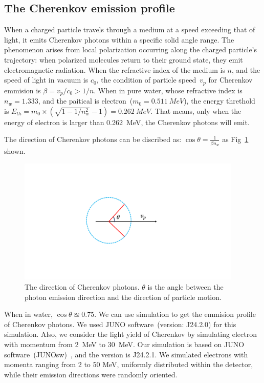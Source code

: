 \subsection{The Cherenkov emission profile}
When a charged particle travels through a medium at a speed exceeding that of light, it emits Cherenkov photons within a specific solid angle range. The phenomenon arises from local polarization occurring along the charged particle's trajectory: when polarized molecules return to their ground state, they emit electromagnetic radiation. When the refractive index of the medium is $n$, and the speed of light in vacuum is $c_0$, the condition of particle speed~$v_p$ for Cherenkov emmision is $\beta=v_p/c_0>1/n$. When in pure water, whose refractive index is $n_w=1.333$, and the paitical is electron~($m_0=\SI{0.511}{MeV}$), the energy threthold is $E_{th}=m_0\times(\sqrt{1-1/n_w^2}-1)=\SI{0.262}{MeV}$. That means, only when the energy of electron is larger than \SI{0.262}{MeV}, the Cherenkov photons will emit.

The direction of Cherenkov photons can be discribed as: $\cos\theta=\frac{1}{\beta n_w}$ as Fig~\ref{Fig:Cherenkov_emmision} shown.

\begin{figure}
	\begin{center}
		\includegraphics[height=6cm]{reconstruction/cherenkov_emission.pdf}
	\end{center}
	\caption{The direction of Cherenkov photons. $\theta$ is the angle between the photon emission direction and the direction of particle motion.}
	\label{Fig:Cherenkov_emmision}
\end{figure}

When in water, $\cos\theta\approxeq0.75$. We can use simulation to get the emmision profile of Cherenkov photons. We used JUNO software~(version: J24.2.0) for this simulation. Also, we consider the light yield of Cherenkov by simulating electron with momentum from \SI{2}{MeV} to \SI{30}{MeV}. Our simulation is based on JUNO software~(JUNOsw)~\cite{junosw}, and the version is J24.2.1. We simulated electrons with momenta ranging from 2 to 50 MeV, uniformly distributed within the detector, while their emission directions were randomly oriented.


